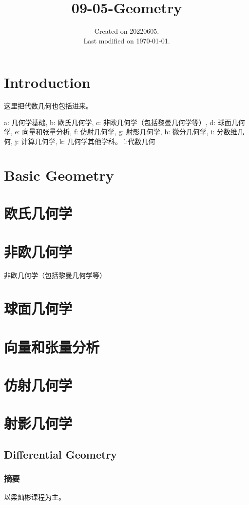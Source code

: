 \documentclass[UTF8]{../09-Mathematics}
\begin{document}
\title{09-05-Geometry}
\date{Created on 20220605.\\   Last modified on \today.}
\maketitle
\tableofcontents


\chapter{Introduction}
这里把代数几何也包括进来。

a: 几何学基础, 
b: 欧氏几何学, 
c: 非欧几何学（包括黎曼几何学等）, 
d: 球面几何学, 
e: 向量和张量分析, 
f: 仿射几何学, 
g: 射影几何学, 
h: 微分几何学, 
i: 分数维几何, 
j: 计算几何学, 
k: 几何学其他学科。
l:代数几何

\chapter{Basic Geometry}

\chapter{欧氏几何学}
\chapter{非欧几何学}
非欧几何学（包括黎曼几何学等）

\chapter{球面几何学}


\chapter{向量和张量分析}
\chapter{仿射几何学}
\chapter{射影几何学}




\section{Differential Geometry}
\subsection{摘要}
以梁灿彬课程为主。
\end{document}
